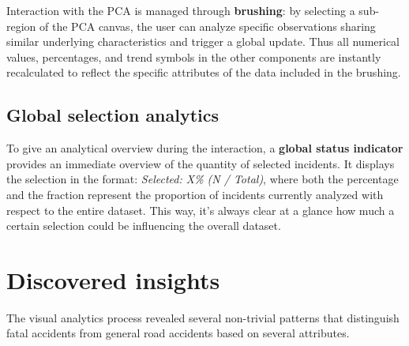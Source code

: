 \documentclass[12pt]{article}
\begin{document}
Interaction with the PCA is managed through \textbf{brushing}: by selecting a sub-region of the PCA canvas, the user can analyze specific observations sharing similar underlying characteristics and trigger a global update. Thus all numerical values, percentages, and trend symbols in the other components are instantly recalculated to reflect the specific attributes of the data included in the brushing.

\subsection{Global selection analytics}
To give an analytical overview during the interaction, a \textbf{global status indicator} provides an immediate overview of the quantity of selected incidents. It displays the selection in the format: \textit{Selected: X\% (N / Total)}, where both the percentage and the fraction represent the proportion of incidents currently analyzed with respect to the entire dataset. This way, it's always clear at a glance how much a certain selection could be influencing the overall dataset. 
 
\section{Discovered insights}

The visual analytics process revealed several non-trivial patterns that distinguish fatal accidents from general road accidents based on several attributes.
\end{document}
